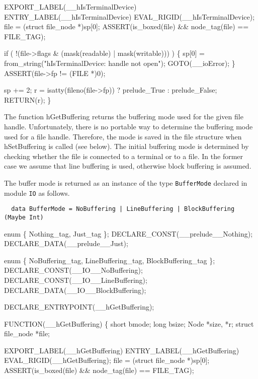     EXPORT_LABEL(__hIsTerminalDevice)
 ENTRY_LABEL(__hIsTerminalDevice)
    EVAL_RIGID(__hIsTerminalDevice);
    file = (struct file_node *)sp[0];
    ASSERT(is_boxed(file) && node_tag(file) == FILE_TAG);

    if ( !(file->flags & (mask(readable) | mask(writable))) )
    \{
        sp[0] = from_string("hIsTerminalDevice: handle not open");
        GOTO(__ioError);
    \}
    ASSERT(file->fp != (FILE *)0);

    sp += 2;
    r   = isatty(fileno(file->fp)) ? prelude_True : prelude_False;
    RETURN(r);
\}

\nwendcode{}\nwdocspar
The function {\Tt{}hGetBuffering\nwendquote} returns the buffering mode used for the
given file handle. Unfortunately, there is no portable way to
determine the buffering mode used for a file handle. Therefore, the
mode is saved in the file structure when {\Tt{}hSetBuffering\nwendquote} is called
(see below). The initial buffering mode is determined by checking
whether the file is connected to a terminal or to a file. In the
former case we assume that line buffering is used, otherwise block
buffering is assumed.

The buffer mode is returned as an instance of the type
\texttt{BufferMode} declared in module \texttt{IO} as follows.
\begin{verbatim}
  data BufferMode = NoBuffering | LineBuffering | BlockBuffering (Maybe Int)
\end{verbatim}

\nwenddocs{}\plusendmoddef\nwstartdeflinemarkup{}\nwenddeflinemarkup
enum \{ Nothing_tag, Just_tag \};
DECLARE_CONST(__prelude__Nothing);
DECLARE_DATA(__prelude__Just);

enum \{ NoBuffering_tag, LineBuffering_tag, BlockBuffering_tag \};
DECLARE_CONST(__IO__NoBuffering);
DECLARE_CONST(__IO__LineBuffering);
DECLARE_DATA(__IO__BlockBuffering);

DECLARE_ENTRYPOINT(__hGetBuffering); 

FUNCTION(__hGetBuffering)
\{
    short            bmode;
    long             bsize;
    Node             *size, *r;
    struct file_node *file;

    EXPORT_LABEL(__hGetBuffering)
 ENTRY_LABEL(__hGetBuffering)
    EVAL_RIGID(__hGetBuffering);
    file = (struct file_node *)sp[0];
    ASSERT(is_boxed(file) && node_tag(file) == FILE_TAG);


